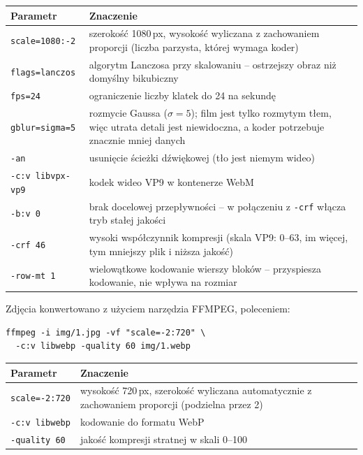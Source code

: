 \begin{tablehere}
\centering
\begin{tabular}{l p{9cm}}
\toprule
\textbf{Parametr} & \textbf{Znaczenie} \\
\midrule
\texttt{scale=1080:-2} & szerokość 1080\,px, wysokość wyliczana z zachowaniem proporcji
  (liczba parzysta, której wymaga koder) \\
\texttt{flags=lanczos} & algorytm Lanczosa przy skalowaniu -- ostrzejszy obraz niż
  domyślny bikubiczny \\
\texttt{fps=24} & ograniczenie liczby klatek do 24 na sekundę \\
\texttt{gblur=sigma=5} & rozmycie Gaussa ($\sigma=5$); film jest tylko
  rozmytym tłem, więc utrata detali jest niewidoczna, a koder potrzebuje
  znacznie mniej danych \\
\texttt{-an} & usunięcie ścieżki dźwiękowej (tło jest niemym wideo) \\
\texttt{-c:v libvpx-vp9} & kodek wideo VP9 w kontenerze WebM \\
\texttt{-b:v 0} & brak docelowej przepływności -- w połączeniu z \texttt{-crf}
  włącza tryb stałej jakości \\
\texttt{-crf 46} & wysoki współczynnik kompresji (skala VP9: 0--63, im więcej,
  tym mniejszy plik i niższa jakość) \\
\texttt{-row-mt 1} & wielowątkowe kodowanie wierszy bloków -- przyspiesza
  kodowanie, nie wpływa na rozmiar \\
\bottomrule
\end{tabular}
\caption{Parametry konwersji filmu}
\end{tablehere}

Zdjęcia konwertowano z użyciem narzędzia FFMPEG, poleceniem:

\begin{verbatim}
ffmpeg -i img/1.jpg -vf "scale=-2:720" \
  -c:v libwebp -quality 60 img/1.webp
\end{verbatim}

\begin{tablehere}
\centering
\begin{tabular}{l p{9cm}}
\toprule
\textbf{Parametr} & \textbf{Znaczenie} \\
\midrule
\texttt{scale=-2:720} & wysokość 720\,px, szerokość wyliczana automatycznie
  z zachowaniem proporcji (podzielna przez 2) \\
\texttt{-c:v libwebp} & kodowanie do formatu WebP \\
\texttt{-quality 60} & jakość kompresji stratnej w skali 0--100 \\
\bottomrule
\end{tabular}
\caption{Parametry konwersji zdjęć}
\end{tablehere}

